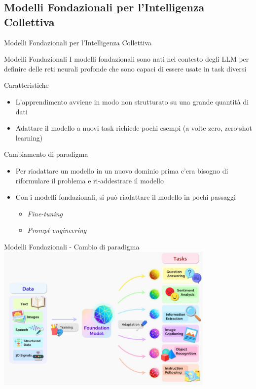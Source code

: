 \documentclass[presentation, 10pt,aspectratio=169]{beamer}\mode<presentation>{\usetheme{AMSBolognaFC}}
\begin{document}
\subsection{Modelli Fondazionali per l'Intelligenza Collettiva}
\begin{frame}{Modelli Fondazionali per l'Intelligenza Collettiva}
	\begin{exampleblock}{Modelli Fondazionali}
		I modelli fondazionali sono nati nel contesto degli LLM per definire delle reti neurali profonde che sono capaci di essere usate in task diversi
	\end{exampleblock}
	\begin{alertblock}{Caratteristiche}
		\begin{itemize}
			\item L'apprendimento avviene in modo non strutturato su una grande quantità di dati
			\item Adattare il modello a nuovi task richiede pochi esempi (a volte zero, zero-shot learning)
		\end{itemize}
	\end{alertblock}
	\begin{block}{Cambiamento di paradigma}
		\begin{itemize}
			\item Per riadattare un modello in un nuovo dominio prima c'era bisogno di riformulare il problema e ri-addestrare il modello
			\item Con i modelli fondazionali, si può riadattare il modello in pochi passaggi
			\begin{itemize}
				\item \emph{Fine-tuning}
				\item \emph{Prompt-engineering}
			\end{itemize}
		\end{itemize}
	\end{block}
\end{frame}
\begin{frame}{Modelli Fondazionali - Cambio di paradigma}
\centering
\includegraphics[width=0.8\textwidth]{img/fondational-models.png}
\end{frame}
\end{document}
